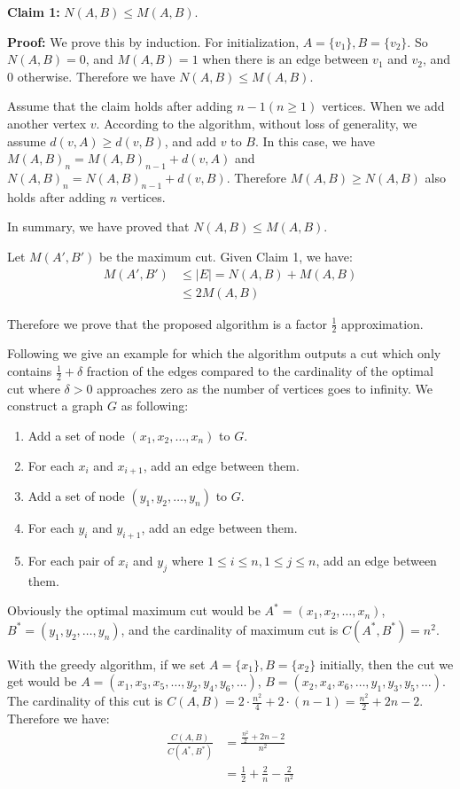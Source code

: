 \documentclass{article}
\begin{document}
\textbf{Claim 1:} $N(A, B) \leq M(A, B)$.

\textbf{Proof:}
We prove this by induction. For initialization, $A = \{v_1\}, B = \{v_2\}$. So $N(A, B) = 0$, and 
$M(A, B) = 1$ when there is an edge between $v_1$ and $v_2$, and $0$ otherwise. Therefore we have
$N(A, B) \leq M(A, B)$.

Assume that the claim holds after adding $n - 1 (n \geq 1)$ vertices. When we add another vertex
$v$. According to the algorithm, without loss of generality, we assume $d(v, A) \geq d(v, B)$, and
add $v$ to $B$. In
this case, we have $M(A, B)_n = M(A, B)_{n-1} + d(v, A)$ and $N(A, B)_n = N(A, B)_{n-1} + d(v, B)$.
Therefore $M(A, B) \geq N(A, B)$ also holds after adding $n$ vertices.

In summary, we have proved that $N(A, B) \leq M(A, B)$.

Let $M(A', B')$ be the maximum cut. Given Claim 1, we have:
\begin{align}
M(A', B') & \leq |E| = N(A, B) + M(A, B)\\
  & \leq 2 M(A, B)
\end{align}

Therefore we prove that the proposed algorithm is a factor $\frac{1}{2}$ approximation.

Following we give an example for which the algorithm
outputs a cut which only contains $\frac{1}{2}+\delta$ fraction of the edges compared to the cardinality of the optimal cut
where $\delta > 0$ approaches zero as the number of vertices goes to infinity. We construct a graph
$G$ as  following:


\begin{enumerate}
  \item Add a set of node $(x_1, x_2, \dots, x_n)$ to $G$.
  \item For each $x_i$ and $x_{i+1}$, add an edge between them.
  \item Add a set of node $(y_1, y_2, \dots, y_n)$ to $G$.
  \item For each $y_i$ and $y_{i+1}$, add an edge between them.
  \item For each pair of $x_i$ and $y_j$ where $ 1 \leq i \leq n, 1 \leq j \leq n$, add an edge
    between them.
\end{enumerate}

Obviously the optimal maximum cut would be $A^* = (x_1, x_2, \dots, x_n)$, $B^* = (y_1, y_2, \dots,
y_n)$, and the cardinality of maximum cut is $C(A^*, B^*) = n^2$.

With the greedy algorithm, if we set $A = \{x_1\}, B = \{x_2\}$ initially, then the cut we get would
be $A = (x_1, x_3, x_5, \dots, y_2, y_4, y_6, \dots)$, $B = (x_2, x_4, x_6, \dots, y_1, y_3, y_5,
\dots)$. The cardinality of this cut is $C(A, B) = 2 \cdot \frac{n^2}{4} + 2 \cdot(n-1) =
\frac{n^2}{2} + 2n -2$. Therefore we have:
\begin{align}
  \frac{C(A, B)}{C(A^*, B^*)} &= \frac{\frac{n^2}{2} + 2n -2}{n^2} \\ 
  &= \frac{1}{2} + \frac{2}{n} - \frac{2}{n^2}
\end{align}
\end{document}
